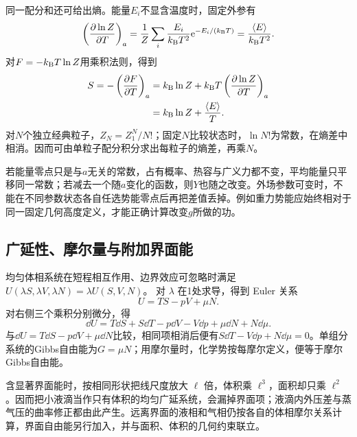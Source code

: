 同一配分和还可给出熵。能量$E_i$不显含温度时，固定外参有
\[
 \left(\frac{\partial\ln Z}{\partial T}\right)_a
 =\frac1Z\sum_i\frac{E_i}{k_{\mathrm B} T^2}\mathrm e^{-E_i/(k_{\mathrm B} T)}
 =\frac{\langle E\rangle}{k_{\mathrm B} T^2}.
\]
对$F=-k_{\mathrm B} T\ln Z$用乘积法则，得到
\begin{equation}\label{eq:canonicalentropy}
 \begin{aligned}
 S=-\left(\frac{\partial F}{\partial T}\right)_a
 &=k_{\mathrm B}\ln Z+k_{\mathrm B} T\left(\frac{\partial\ln Z}{\partial T}\right)_a\\
 &=k_{\mathrm B}\ln Z+\frac{\langle E\rangle}{T}.
 \end{aligned}
\end{equation}
对$N$个独立经典粒子，$Z_N=Z_1^N/N!$；固定$N$比较状态时，$\ln N!$为常数，在熵差中相消。因而可由单粒子配分积分求出每粒子的熵差，再乘$N$。

若能量零点只是与$a$无关的常数，占有概率、热容与广义力都不变，平均能量只平移同一常数；若减去一个随$a$变化的函数，则$Y$也随之改变。外场参数可变时，不能在不同参数状态各自任选势能零点后再把差值丢掉。例如重力势能应始终相对于同一固定几何高度定义，才能正确计算改变$g$所做的功。

\subsection{广延性、摩尔量与附加界面能}
均匀体相系统在短程相互作用、边界效应可忽略时满足
$U(\lambda S,\lambda V,\lambda N)=\lambda U(S,V,N)$。
对 $\lambda$ 在1处求导，得到 Euler 关系
\[
 U=TS-pV+\mu N.
\]
对右侧三个乘积分别微分，得
\[
 \dd U=T\dd S+S\dd T-p\dd V-V\dd p+\mu\dd N+N\dd\mu.
\]
与$\dd U=T\dd S-p\dd V+\mu\dd N$比较，相同项相消后便有$S\dd T-V\dd p+N\dd\mu=0$。单组分系统的Gibbs自由能为$G=\mu N$；用摩尔量时，化学势按每摩尔定义，便等于摩尔Gibbs自由能。

含显著界面能时，按相同形状把线尺度放大 $\ell$ 倍，体积乘 $\ell^3$，面积却只乘 $\ell^2$。因而把小液滴当作只有体积的均匀广延系统，会漏掉界面项；液滴内外压差与蒸气压的曲率修正都由此产生。远离界面的液相和气相仍按各自的体相摩尔关系计算，界面自由能另行加入，并与面积、体积的几何约束联立。

